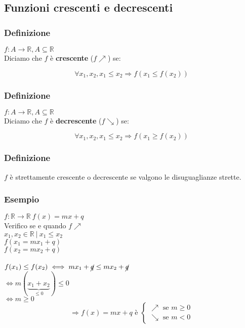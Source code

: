 \subsection{Funzioni crescenti e decrescenti}
    \subsubsection*{Definizione}
        $f:A\rightarrow \mathbb{R}, A \subseteq \mathbb{R}$ \\
        Diciamo che $f$ è \textbf{crescente} ($f \nearrow$) se:
        \begin{Large}
            \[
                \forall x_{1},x_{2}, x_{1}\leq x_{2} \Rightarrow f(x_{1}\leq f(x_{2}))
            \]
        \end{Large}
    \subsubsection*{Definizione}
        $f:A \rightarrow \mathbb{R}, A \subseteq \mathbb{R}$ \\
        Diciamo che $f$ è \textbf{decrescente} ($f \searrow$) se:
        \begin{Large}
            \[
                \forall x_{1},x_{2}, x_{1}\leq x_{2} \Rightarrow f(x_{1}\geq f(x_{2}))    
            \]
        \end{Large}
    \subsubsection*{Definizione}
        $f$ è strettamente crescente o decrescente se valgono le disuguaglianze strette.
    \subsubsection*{Esempio}
        $f:\mathbb{R} \rightarrow \mathbb{R}\ f(x) = mx + q$ \\
        Verifico se e quando $f \nearrow$ \\
        $x_{1},x_{2} \in \mathbb{R}\ |\ x_{1} \leq x_{2}$ \\
        $f(x_{1} = mx_{1} + q)$ \\
        $f(x_{2} = mx_{2} + q)$ \\ \\
        $f(x_1) \leq f(x_2) \iff mx_{1} + \cancel{q} \leq mx_{2} + \cancel{q}$\\
        $\iff m(\underbrace{x_1+x_{2}}_{\leq 0}) \leq 0$ \\
        $\iff m \geq 0$ \\
            \[
                \Rightarrow f(x) = mx+q \text{ è } 
                \begin{cases}
                    \nearrow \text{ se } m \geq 0\\
                    \searrow \text{ se } m < 0
                \end{cases}
            \]

